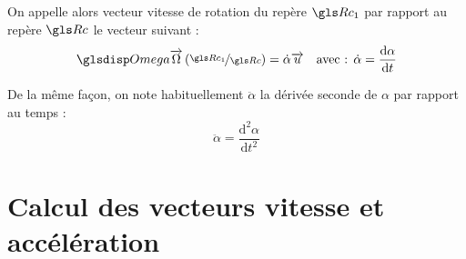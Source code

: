 		On appelle alors vecteur vitesse de rotation du repère $\Rc_1$ par rapport au repère $\Rc$ le vecteur suivant :
		\begin{equation}
			\Om{\Rc_1}=\dot{\alpha}\vect{u} \quad \text{avec : } \dot{\alpha}=\frac{\mathrm{d}\alpha}{\mathrm{d}t}
		\end{equation}
		
		\begin{note}
De la même façon, on note habituellement $\ddot{\alpha}$ la dérivée seconde de $\alpha$ par rapport au temps :
			\begin{equation}
				\ddot{\alpha}=\frac{\mathrm{d}^2\alpha}{\mathrm{d}t^2}
			\end{equation}
		\end{note}
	
	\section{Calcul des vecteurs vitesse et accélération}
	\begin{theorem}
	\end{theorem}
	
